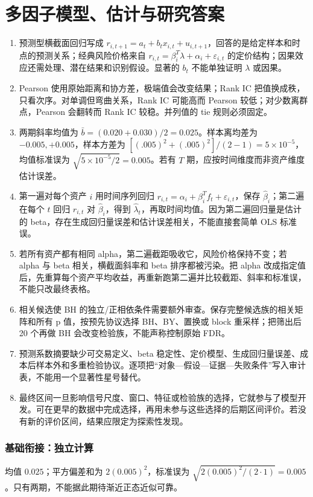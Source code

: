 \chapter{多因子模型、估计与研究答案}

\begin{enumerate}[leftmargin=*]
  \item 预测型横截面回归写成 $r_{i,t+1}=a_t+b_t x_{i,t}+u_{i,t+1}$，回答的是给定样本和时点的预测关系；经典风险价格来自 $r_{i,t}=\beta_i^T\lambda+\alpha_i+\varepsilon_{i,t}$ 的定价结构；因果效应还需处理、潜在结果和识别假设。显著的 $b_t$ 不能单独证明 $\lambda$ 或因果。
  \item Pearson 使用原始距离和协方差，极端值会改变结果；Rank IC 把值换成秩，只看次序。对单调但弯曲关系，Rank IC 可能高而 Pearson 较低；对少数离群点，Pearson 会翻转而 Rank IC 较稳。并列值的 tie 规则必须固定。
  \item 两期斜率均值为 $\bar b=(0.020+0.030)/2=0.025$。样本离均差为 $-0.005,+0.005$，样本方差为 $[(.005)^2+(.005)^2]/(2-1)=5\times10^{-5}$，均值标准误为 $\sqrt{5\times10^{-5}/2}=0.005$。若有 $T$ 期，应按时间维度而非资产维度估计误差。
  \item 第一遍对每个资产 $i$ 用时间序列回归 $r_{i,t}=\alpha_i+\beta_i^Tf_t+\varepsilon_{i,t}$，保存 $\widehat\beta_i$；第二遍在每个 $t$ 回归 $r_{i,t}$ 对 $\widehat\beta_i$，得到 $\widehat\lambda_t$，再取时间均值。因为第二遍回归量是估计的 beta，存在生成回归量误差和估计误差相关，不能直接套简单 OLS 标准误。
  \item 若所有资产都有相同 alpha，第二遍截距吸收它，风险价格保持不变；若 alpha 与 beta 相关，横截面斜率和 beta 排序都被污染。把 alpha 改成指定值后，先重算每个资产平均收益，再重新跑第二遍并比较截距、斜率和标准误，不能只改最终表格。
  \item 相关候选使 BH 的独立/正相依条件需要额外审查。保存完整候选族的相关矩阵和所有 p 值，按预先协议选择 BH、BY、置换或 block 重采样；把筛出后 20 个再做 BH 会改变检验族，不能声称控制原始 FDR。
  \item 预测系数摘要缺少可交易定义、beta 稳定性、定价模型、生成回归量误差、成本后样本外和多重检验协议。逐项把“对象—假设—证据—失败条件”写入审计表，不能用一个显著性星号替代。
  \item 最终区间一旦影响信号尺度、窗口、特征或检验族的选择，它就参与了模型开发。可在更早的数据中完成选择，再用未参与这些选择的后期区间评价。若没有新的评价区间，结果应限定为探索性发现。
\end{enumerate}

\subsection*{基础衔接：独立计算}
均值 $0.025$；平方偏差和为 $2(0.005)^2$，标准误为 $\sqrt{2(0.005)^2/(2\cdot1)}=0.005$。只有两期，不能据此期待渐近正态近似可靠。

